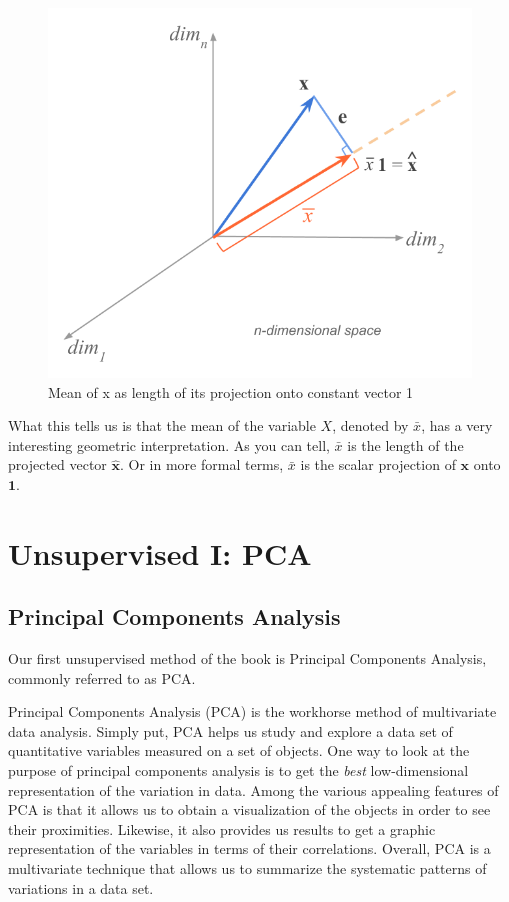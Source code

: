 \documentclass[]{book}
\begin{document}
\begin{figure}

{\centering \includegraphics[width=0.6\linewidth]{images/duality/mean-projection2} 

}

\caption{Mean of x as length of its projection onto constant vector 1}\label{fig:unnamed-chunk-22}
\end{figure}

What this tells us is that the mean of the variable \(X\), denoted by \(\bar{x}\),
has a very interesting geometric interpretation. As you can tell, \(\bar{x}\) is
the length of the projected vector \(\mathbf{\hat{x}}\). Or in more formal terms,
\(\bar{x}\) is the scalar projection of \(\mathbf{x}\) onto \(\mathbf{1}\).

\hypertarget{part-unsupervised-i-pca}{%
\part{Unsupervised I: PCA}\label{part-unsupervised-i-pca}}

\hypertarget{pca}{%
\chapter{Principal Components Analysis}\label{pca}}

Our first unsupervised method of the book is Principal Components Analysis,
commonly referred to as PCA.

Principal Components Analysis (PCA) is the workhorse method of multivariate data
analysis. Simply put, PCA helps us study and explore a data set of quantitative
variables measured on a set of objects. One way to look at the purpose of principal
components analysis is to get the \emph{best} low-dimensional representation of the
variation in data. Among the various appealing features of PCA is that it allows
us to obtain a visualization of the objects in order to see their proximities.
Likewise, it also provides us results to get a graphic representation of the
variables in terms of their correlations. Overall, PCA is a multivariate technique
that allows us to summarize the systematic patterns of variations in a data set.
\end{document}
